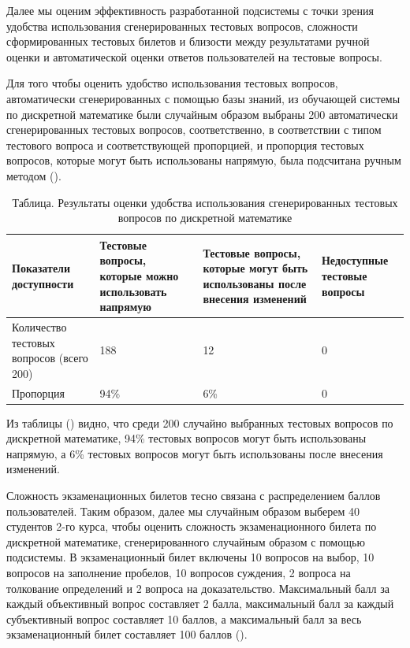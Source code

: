 Далее мы оценим эффективность разработанной подсистемы с точки зрения удобства использования сгенерированных тестовых вопросов, сложности сформированных тестовых билетов и близости между результатами ручной оценки и автоматической оценки ответов пользователей на тестовые вопросы.

Для того чтобы оценить удобство использования тестовых вопросов, автоматически сгенерированных с помощью базы знаний, из обучающей системы по дискретной математике были случайным образом выбраны 200 автоматически сгенерированных тестовых вопросов, соответственно, в соответствии с типом тестового вопроса и соответствующей пропорцией, и пропорция тестовых вопросов, которые могут быть использованы напрямую, была подсчитана ручным методом (\textit{}).

\begin{table}[!htbp]
	\centering
	\caption{Таблица. Результаты оценки удобства использования сгенерированных тестовых вопросов по дискретной математике}
	\label{tab:usability_test_questions}
		\begin{tabular}{|p{}|p{}|p{}|p{}|} 
			\hline 
			Показатели доступности&Тестовые вопросы,  которые можно использовать напрямую&Тестовые вопросы, которые могут быть использованы после внесения изменений&Недоступные тестовые вопросы\\
			\hline  
			Количество тестовых вопросов (всего 200)&188&12&0\\
			\hline
			Пропорция&94\%&6\%&0\\
			\hline  
		\end{tabular}
\end{table}

Из таблицы (\textit{}) видно, что среди 200 случайно выбранных тестовых вопросов по дискретной математике, 94\% тестовых вопросов могут быть использованы  напрямую, а 6\% тестовых вопросов могут быть использованы после внесения изменений.

Сложность экзаменационных билетов тесно связана с распределением баллов пользователей. Таким образом, далее мы случайным образом выберем 40 студентов 2-го курса, чтобы оценить сложность экзаменационного билета по дискретной математике, сгенерированного случайным образом с помощью подсистемы. В экзаменационный билет включены 10 вопросов на выбор, 10 вопросов на заполнение пробелов, 10 вопросов суждения, 2 вопроса на толкование определений и 2 вопроса на доказательство. Максимальный балл за каждый объективный вопрос составляет 2 балла, максимальный балл за каждый субъективный вопрос составляет 10 баллов, а максимальный балл за весь экзаменационный билет составляет 100 баллов (\textit{}). 

